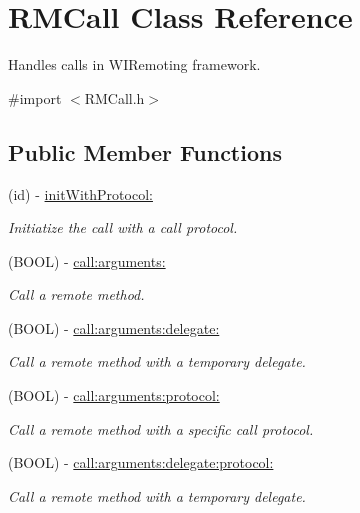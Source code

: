 \hypertarget{interface_r_m_call}{
\section{RMCall Class Reference}
\label{interface_r_m_call}
}


Handles calls in WIRemoting framework.  


{\ttfamily \#import $<$RMCall.h$>$}\subsection*{Public Member Functions}
\begin{DoxyCompactItemize}
\item 
(id) -\/ \hyperlink{interface_r_m_call_a64f1e76758d2d473859064c5b0c6c75d}{initWithProtocol:}
\begin{DoxyCompactList}\small\item\em Initiatize the call with a call protocol. \item\end{DoxyCompactList}\item 
(BOOL) -\/ \hyperlink{interface_r_m_call_a2c8e09fb8f50b66a2ceb3efac2dd9e6b}{call:arguments:}
\begin{DoxyCompactList}\small\item\em Call a remote method. \item\end{DoxyCompactList}\item 
(BOOL) -\/ \hyperlink{interface_r_m_call_a45876bba77d77d080a2a15cd38c77358}{call:arguments:delegate:}
\begin{DoxyCompactList}\small\item\em Call a remote method with a temporary delegate. \item\end{DoxyCompactList}\item 
(BOOL) -\/ \hyperlink{interface_r_m_call_ab9818645989afce7fc2327926d4024b8}{call:arguments:protocol:}
\begin{DoxyCompactList}\small\item\em Call a remote method with a specific call protocol. \item\end{DoxyCompactList}\item 
(BOOL) -\/ \hyperlink{interface_r_m_call_aa01a7d4b9ff68f7cc187d52fba7b19b2}{call:arguments:delegate:protocol:}
\begin{DoxyCompactList}\small\item\em Call a remote method with a temporary delegate. \item\end{DoxyCompactList}\item 

\end{DoxyCompactItemize}
